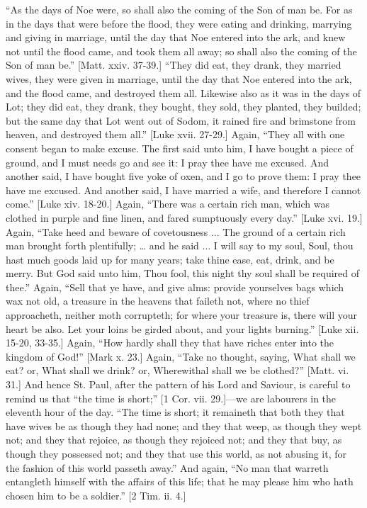 ``As the days of Noe were, so shall also the coming of the Son
of man be. For as in the days that were before the flood, they were
eating and drinking, marrying and giving in marriage, until the day
that Noe entered into the ark, and knew not until the flood came, and
took them all away; so shall also the coming of the Son of man
be.'' [Matt. xxiv. 37-39.] ``They did eat, they drank, they
married wives, they were given in marriage, until the day that Noe
entered into the ark, and the flood came, and destroyed them all.
Likewise also as it was in the days of Lot; they did eat, they drank,
they bought, they sold, they planted, they builded; but the same day
that Lot went out of Sodom, it rained fire and brimstone from heaven,
and destroyed them all.'' [Luke xvii. 27-29.] Again, ``They
all with one consent began to make excuse. The first said unto him, I
have bought a piece of ground, and I must needs go and see it: I pray
thee have me excused. And another said, I have bought five yoke of
oxen, and I go to prove them: I pray thee have me excused. And another
said, I have married a wife, and therefore I cannot come.'' [Luke
xiv. 18-20.] Again, ``There was a certain rich man, which was
clothed in purple and fine linen, and fared sumptuously every
day.'' [Luke xvi. 19.] Again, ``Take heed and beware of
covetousness ... The ground of a certain rich man brought forth
plentifully; … and he said ... I will say to my soul, Soul, thou
hast much goods laid up for many years; take thine ease, eat, drink,
and be merry. But God said unto him, Thou fool, this night thy soul
shall be required of thee.'' Again, ``Sell that ye have, and
give alms: provide yourselves bags which wax not old, a treasure in
the heavens that faileth not, where no thief approacheth, neither moth
corrupteth; for where your treasure is, there will your heart be also.
Let your loins be girded about, and your lights burning.'' [Luke
xii. 15-20, 33-35.] Again, ``How hardly shall they that have
riches enter into the kingdom of God!'' [Mark x. 23.] Again,
``Take no thought, saying, What shall we eat? or, What shall we
drink? or, Wherewithal shall we be clothed?'' [Matt. vi. 31.] And
hence St. Paul, after the pattern of his Lord and Saviour, is careful
to remind us that ``the time is short;'' [1 Cor. vii. 29.]—we
are labourers in the eleventh hour of the day. ``The time is
short; it remaineth that both they that have wives be as though they
had none; and they that weep, as though they wept not; and they that
rejoice, as though they rejoiced not; and they that buy, as though
they possessed not; and they that use this world, as not abusing it,
for the fashion of this world passeth away.'' And again, ``No
man that warreth entangleth himself with the affairs of this life;
that he may please him who hath chosen him to be a soldier.'' [2
Tim. ii. 4.]

